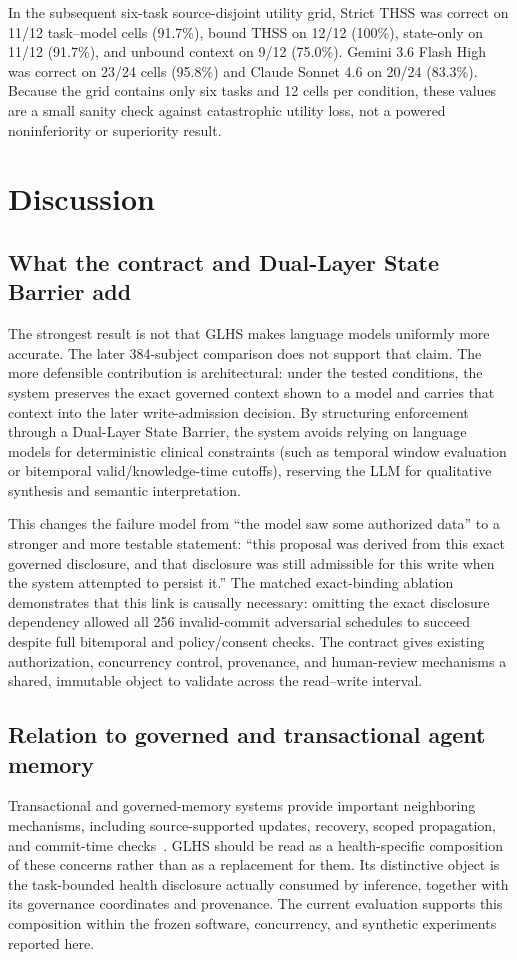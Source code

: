 \documentclass[11pt]{article}
\begin{document}
In the subsequent six-task source-disjoint utility grid, Strict THSS was correct on 11/12 task--model cells (91.7\%), bound THSS on 12/12 (100\%), state-only on 11/12 (91.7\%), and unbound context on 9/12 (75.0\%). Gemini 3.6 Flash High was correct on 23/24 cells (95.8\%) and Claude Sonnet 4.6 on 20/24 (83.3\%). Because the grid contains only six tasks and 12 cells per condition, these values are a small sanity check against catastrophic utility loss, not a powered noninferiority or superiority result.

\section{Discussion}
\subsection{What the contract and Dual-Layer State Barrier add}
The strongest result is not that GLHS makes language models uniformly more accurate. The later 384-subject comparison does not support that claim. The more defensible contribution is architectural: under the tested conditions, the system preserves the exact governed context shown to a model and carries that context into the later write-admission decision. By structuring enforcement through a Dual-Layer State Barrier, the system avoids relying on language models for deterministic clinical constraints (such as temporal window evaluation or bitemporal valid/knowledge-time cutoffs), reserving the LLM for qualitative synthesis and semantic interpretation.

This changes the failure model from ``the model saw some authorized data'' to a stronger and more testable statement: ``this proposal was derived from this exact governed disclosure, and that disclosure was still admissible for this write when the system attempted to persist it.'' The matched exact-binding ablation demonstrates that this link is causally necessary: omitting the exact disclosure dependency allowed all 256 invalid-commit adversarial schedules to succeed despite full bitemporal and policy/consent checks. The contract gives existing authorization, concurrency control, provenance, and human-review mechanisms a shared, immutable object to validate across the read--write interval.

\subsection{Relation to governed and transactional agent memory}
Transactional and governed-memory systems provide important neighboring mechanisms, including source-supported updates, recovery, scoped propagation, and commit-time checks~\cite{memtx,memtxn,memclaw,temporaryauth,statefulgov}. GLHS should be read as a health-specific composition of these concerns rather than as a replacement for them. Its distinctive object is the task-bounded health disclosure actually consumed by inference, together with its governance coordinates and provenance. The current evaluation supports this composition within the frozen software, concurrency, and synthetic experiments reported here.
\end{document}
